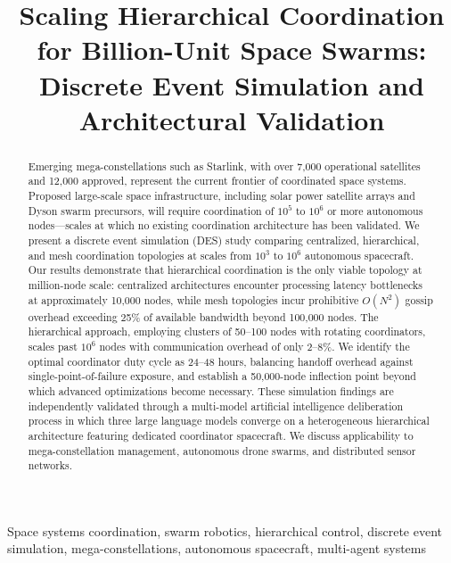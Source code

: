 \documentclass[journal]{IEEEtran}
\begin{document}
\title{Scaling Hierarchical Coordination for Billion-Unit Space Swarms: Discrete Event Simulation and Architectural Validation}

\author{
}


\maketitle

\begin{abstract}
Emerging mega-constellations such as Starlink, with over 7{,}000 operational satellites and 12{,}000 approved, represent the current frontier of coordinated space systems. Proposed large-scale space infrastructure, including solar power satellite arrays and Dyson swarm precursors, will require coordination of $10^5$ to $10^6$ or more autonomous nodes---scales at which no existing coordination architecture has been validated. We present a discrete event simulation (DES) study comparing centralized, hierarchical, and mesh coordination topologies at scales from $10^3$ to $10^6$ autonomous spacecraft. Our results demonstrate that hierarchical coordination is the only viable topology at million-node scale: centralized architectures encounter processing latency bottlenecks at approximately 10{,}000 nodes, while mesh topologies incur prohibitive $O(N^2)$ gossip overhead exceeding 25\% of available bandwidth beyond 100{,}000 nodes. The hierarchical approach, employing clusters of 50--100 nodes with rotating coordinators, scales past $10^6$ nodes with communication overhead of only 2--8\%. We identify the optimal coordinator duty cycle as 24--48 hours, balancing handoff overhead against single-point-of-failure exposure, and establish a 50{,}000-node inflection point beyond which advanced optimizations become necessary. These simulation findings are independently validated through a multi-model artificial intelligence deliberation process in which three large language models converge on a heterogeneous hierarchical architecture featuring dedicated coordinator spacecraft. We discuss applicability to mega-constellation management, autonomous drone swarms, and distributed sensor networks.
\end{abstract}

\begin{IEEEkeywords}
Space systems coordination, swarm robotics, hierarchical control, discrete event simulation, mega-constellations, autonomous spacecraft, multi-agent systems
\end{IEEEkeywords}
\end{document}
